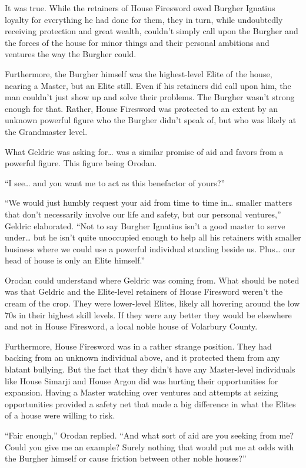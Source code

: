 \documentclass[a4paper,10pt]{book}
\begin{document}
It was true. While the retainers of House Firesword owed Burgher Ignatius loyalty for everything he had done for them, they in turn, while undoubtedly receiving protection and great wealth, couldn’t simply call upon the Burgher and the forces of the house for minor things and their personal ambitions and ventures the way the Burgher could.\par
Furthermore, the Burgher himself was the highest-level Elite of the house, nearing a Master, but an Elite still. Even if his retainers did call upon him, the man couldn’t just show up and solve their problems. The Burgher wasn’t strong enough for that. Rather, House Firesword was protected to an extent by an unknown powerful figure who the Burgher didn’t speak of, but who was likely at the Grandmaster level.\par
What Geldric was asking for… was a similar promise of aid and favors from a powerful figure. This figure being Orodan.\par
“I see… and you want me to act as this benefactor of yours?”\par
“We would just humbly request your aid from time to time in… smaller matters that don’t necessarily involve our life and safety, but our personal ventures,” Geldric elaborated. “Not to say Burgher Ignatius isn’t a good master to serve under… but he isn’t quite unoccupied enough to help all his retainers with smaller business where we could use a powerful individual standing beside us. Plus… our head of house is only an Elite himself.”\par
Orodan could understand where Geldric was coming from. What should be noted was that Geldric and the Elite-level retainers of House Firesword weren’t the cream of the crop. They were lower-level Elites, likely all hovering around the low 70s in their highest skill levels. If they were any better they would be elsewhere and not in House Firesword, a local noble house of Volarbury County.\par
Furthermore, House Firesword was in a rather strange position. They had backing from an unknown individual above, and it protected them from any blatant bullying. But the fact that they didn’t have any Master-level individuals like House Simarji and House Argon did was hurting their opportunities for expansion. Having a Master watching over ventures and attempts at seizing opportunities provided a safety net that made a big difference in what the Elites of a house were willing to risk.\par
“Fair enough,” Orodan replied. “And what sort of aid are you seeking from me? Could you give me an example? Surely nothing that would put me at odds with the Burgher himself or cause friction between other noble houses?”\par
\end{document}
